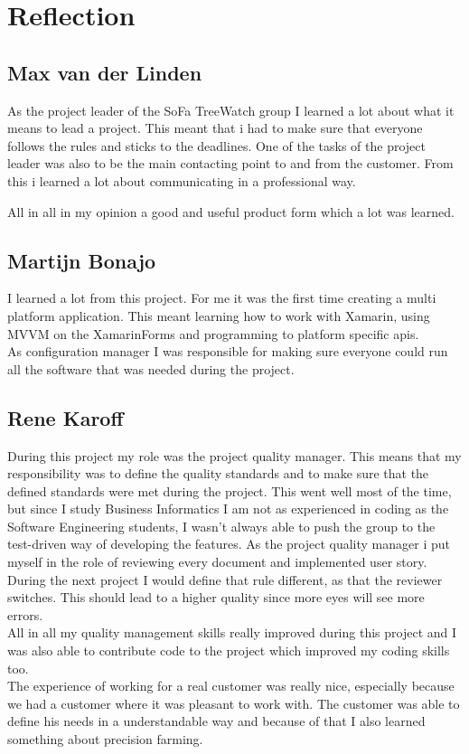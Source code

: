 \section{Reflection}
\subsection{Max van der Linden}
As the project leader of the SoFa TreeWatch group I learned a lot about what it means to lead a project. This meant that i had to make sure that everyone follows the rules and sticks to the deadlines. One of the tasks of the project leader was also to be the main contacting point to and from the customer. From this i learned a lot about communicating in a professional way.

All in all in my opinion a good and useful product form which a lot was learned.

\subsection{Martijn Bonajo}

I learned a lot from this project. For me it was the first time creating a multi platform application. This meant learning how to work with Xamarin, using MVVM on the \gls{XamarinForms} and programming to platform specific \gls{api}s.\\
As configuration manager I was responsible for making sure everyone could run all the software that was needed during the project.

\subsection{Rene Karoff}
During this project my role was the project quality manager. This means that my responsibility was to define the quality standards and to make sure that the defined standards were met during the project. This went well most of the time, but since I study Business Informatics I am not as experienced in coding as the Software Engineering students, I wasn't always able to push the group to the test-driven way of developing the features. As the project quality manager i put myself in the role of reviewing every document and implemented user story. During the next project I would define that rule different, as that the reviewer switches. This should lead to a higher quality since more eyes will see more errors. \\
All in all my quality management skills really improved during this project and I was also able to contribute code to the project which improved my coding skills too.\\
The experience of working for a real customer was really nice, especially because we had a customer where it was pleasant to work with. The customer was able to define his needs in a understandable way and because of that I also learned something about precision farming.
